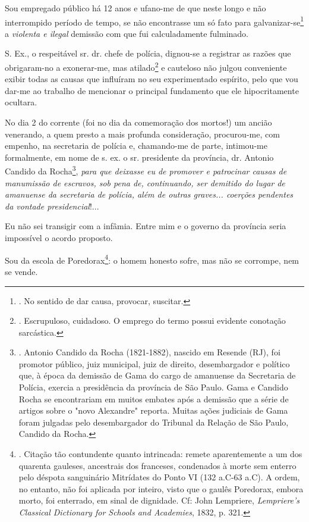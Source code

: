 Sou empregado público há 12 anos e ufano-me de que neste longo e não
interrompido período de tempo, se não encontrasse um só fato para
galvanizar-se\footnote{. No sentido de dar causa, provocar, suscitar.} a
\emph{violenta e ilegal} demissão com que fui calculadamente fulminado.

S. Ex., o respeitável sr. dr. chefe de polícia, dignou-se a registrar as
razões que obrigaram-no a exonerar-me, mas atilado\footnote{.
  Escrupuloso, cuidadoso. O emprego do termo possui evidente conotação
  sarcástica.} e cauteloso não julgou conveniente exibir todas as causas
que influíram no seu experimentado espírito, pelo que vou dar-me ao
trabalho de mencionar o principal fundamento que ele hipocritamente
ocultara.

No dia 2 do corrente (foi no dia da comemoração dos mortos!) um ancião
venerando, a quem presto a mais profunda consideração, procurou-me, com
empenho, na secretaria de polícia e, chamando-me de parte, intimou-me
formalmente, em nome de s. ex. o sr. presidente da província, dr.
Antonio Candido da Rocha\footnote{. Antonio Candido da Rocha
  (1821-1882), nascido em Resende (RJ), foi promotor público, juiz
  municipal, juiz de direito, desembargador e político que, à época da
  demissão de Gama do cargo de amanuense da Secretaria de Polícia,
  exercia a presidência da província de São Paulo. Gama e Candido Rocha
  se encontrariam em muitos embates após a demissão que a série de
  artigos sobre o "novo Alexandre" reporta. Muitas ações judiciais de
  Gama foram julgadas pelo desembargador do Tribunal da Relação de São
  Paulo, Candido da Rocha.}, \emph{para que deixasse eu de promover e
patrocinar causas de manumissão de escravos, sob pena de, continuando,
ser demitido do lugar de amanuense da secretaria de polícia, além de
outras graves... coerções pendentes da vontade presidencial}!...

Eu não sei transigir com a infâmia. Entre mim e o governo da província
seria impossível o acordo proposto.

Sou da escola de Poredorax\footnote{. Citação tão contundente quanto
  intrincada: remete aparentemente a um dos quarenta gauleses,
  ancestrais dos franceses, condenados à morte sem enterro pelo déspota
  sanguinário Mitrídates do Ponto VI (132 a.C-63 a.C). A ordem, no
  entanto, não foi aplicada por inteiro, visto que o gaulês Poredorax,
  embora morto, foi enterrado, em sinal de dignidade. Cf: John
  Lempriere, \emph{Lempriere's Classical Dictionary for Schools and
  Academies}, 1832, p. 321.}: o homem honesto sofre, mas não se
corrompe, nem se vende.

